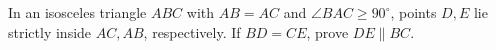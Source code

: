 In an isosceles triangle $ABC$ with $AB=AC$ and $\angle BAC\ge90^\circ$, points $D,E$ lie strictly inside $AC,AB$, respectively. If $BD=CE$, prove $DE\parallel BC$.
